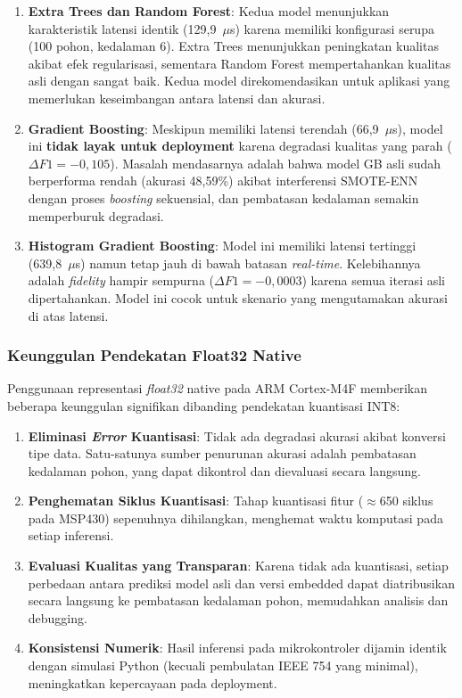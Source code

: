 \begin{enumerate}
    \item \textbf{Extra Trees dan Random Forest}: Kedua model menunjukkan karakteristik latensi identik (129,9~$\mu$s) karena memiliki konfigurasi serupa (100 pohon, kedalaman 6). Extra Trees menunjukkan peningkatan kualitas akibat efek regularisasi, sementara Random Forest mempertahankan kualitas asli dengan sangat baik. Kedua model direkomendasikan untuk aplikasi yang memerlukan keseimbangan antara latensi dan akurasi.

    \item \textbf{Gradient Boosting}: Meskipun memiliki latensi terendah (66,9~$\mu$s), model ini \textbf{tidak layak untuk deployment} karena degradasi kualitas yang parah ($\Delta F1 = -0{,}105$). Masalah mendasarnya adalah bahwa model GB asli sudah berperforma rendah (akurasi 48,59\%) akibat interferensi SMOTE-ENN dengan proses \textit{boosting} sekuensial, dan pembatasan kedalaman semakin memperburuk degradasi.

    \item \textbf{Histogram Gradient Boosting}: Model ini memiliki latensi tertinggi (639,8~$\mu$s) namun tetap jauh di bawah batasan \textit{real-time}. Kelebihannya adalah \textit{fidelity} hampir sempurna ($\Delta F1 = -0{,}0003$) karena semua iterasi asli dipertahankan. Model ini cocok untuk skenario yang mengutamakan akurasi di atas latensi.
\end{enumerate}

\subsubsection{Keunggulan Pendekatan Float32 Native}

Penggunaan representasi \textit{float32} native pada ARM Cortex-M4F memberikan beberapa keunggulan signifikan dibanding pendekatan kuantisasi INT8:

\begin{enumerate}
    \item \textbf{Eliminasi \textit{Error} Kuantisasi}: Tidak ada degradasi akurasi akibat konversi tipe data. Satu-satunya sumber penurunan akurasi adalah pembatasan kedalaman pohon, yang dapat dikontrol dan dievaluasi secara langsung.

    \item \textbf{Penghematan Siklus Kuantisasi}: Tahap kuantisasi fitur ($\approx$650 siklus pada MSP430) sepenuhnya dihilangkan, menghemat waktu komputasi pada setiap inferensi.

    \item \textbf{Evaluasi Kualitas yang Transparan}: Karena tidak ada kuantisasi, setiap perbedaan antara prediksi model asli dan versi embedded dapat diatribusikan secara langsung ke pembatasan kedalaman pohon, memudahkan analisis dan debugging.

    \item \textbf{Konsistensi Numerik}: Hasil inferensi pada mikrokontroler dijamin identik dengan simulasi Python (kecuali pembulatan IEEE 754 yang minimal), meningkatkan kepercayaan pada deployment.
\end{enumerate}

